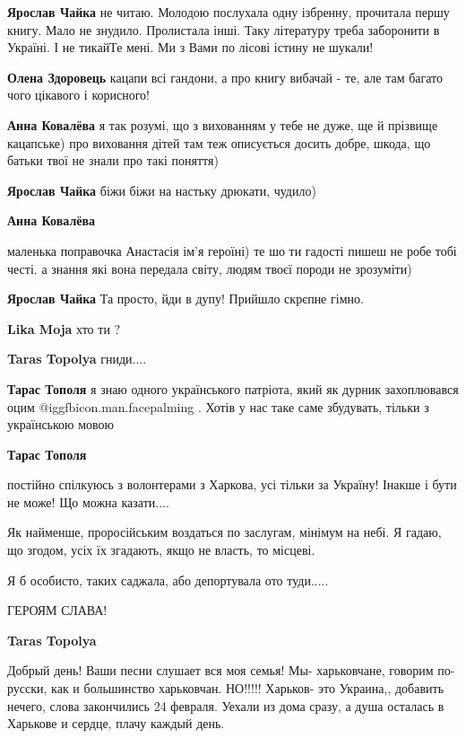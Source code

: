\begin{itemize}
\begin{itemize}
\textbf{Ярослав Чайка} не читаю. Молодою послухала одну ізбренну, прочитала першу книгу. Мало не знудило. Пролистала інші. Таку літературу треба заборонити в Україні. І не тикайТе мені. Ми з Вами по лісові істину не шукали!

\textbf{Олена Здоровець} кацапи всі гандони, а про книгу вибачай - те, але там багато чого цікавого і корисного!

\textbf{Анна Ковалёва} я так розумі, що з вихованням у тебе не дуже, ще й прізвище кацапське) про виховання дітей там теж описується досить добре, шкода, що батьки твої не знали про такі поняття)

\textbf{Ярослав Чайка} біжи біжи на настьку дрюкати, чудило)

\textbf{Анна Ковалёва} 

маленька поправочка Анастасія ім'я героїні) те шо ти гадості пишеш не робе тобі
честі. а знання які вона передала світу, людям твоєї породи не зрозуміти)

\textbf{Ярослав Чайка} Та просто, йди в дупу! Прийшло скрєпне гімно.

\textbf{Lika Moja} хто ти ?

\textbf{Taras Topolya} гниди....

\textbf{Тарас Тополя} я знаю одного українського патріота, який як дурник захоплювався оцим  @igg{fbicon.man.facepalming} . Хотів у нас таке саме збудувать, тільки з українською мовою

\textbf{Тарас Тополя} 

постійно спілкуюсь з волонтерами з Харкова, усі тільки за Україну! Інакше і
бути не може! Що можна казати....

Як найменше, проросійським воздаться по заслугам, мінімум на небі. Я гадаю, що
згодом, усіх їх згадають, якщо не власть, то місцеві.

Я б особисто, таких саджала, або депортувала ото туди.....

ГЕРОЯМ СЛАВА!

\textbf{Taras Topolya} 

Добрый день! Ваши песни слушает вся моя семья! Мы- харьковчане, говорим по-
русски, как и большинство харьковчан. НО!!!!! Харьков- это Украина,, добавить
нечего, слова закончились 24 февраля. Уехали из дома сразу, а душа осталась в
Харькове и сердце, плачу каждый день.


\end{itemize}
\end{itemize}
